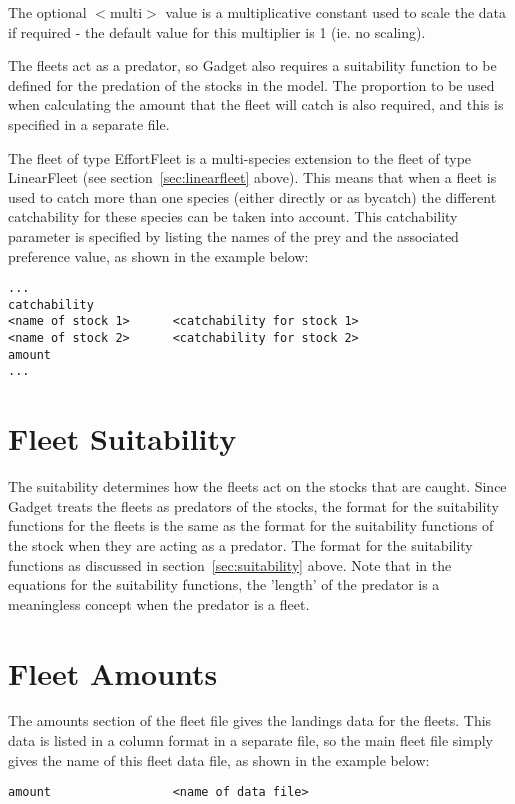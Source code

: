 \documentclass[10pt,twoside]{book}
\begin{document}
The optional $<$multi$>$ value is a multiplicative constant used to scale the data if required - the default value for this multiplier is 1 (ie. no scaling).

\bigskip
The fleets act as a predator, so Gadget also requires a suitability function to be defined for the predation of the stocks in the model.  The proportion to be used when calculating the amount that the fleet will catch is also required, and this is specified in a separate file.

\bigskip
The fleet of type EffortFleet is a multi-species extension to the fleet of type LinearFleet (see section~\ref{sec:linearfleet} above).  This means that when a fleet is used to catch more than one species (either directly or as bycatch) the different catchability for these species can be taken into account.  This catchability parameter is specified by listing the names of the prey and the associated preference value, as shown in the example below:

{\small\begin{verbatim}
...
catchability
<name of stock 1>      <catchability for stock 1>
<name of stock 2>      <catchability for stock 2>
amount
...
\end{verbatim}}

\section{Fleet Suitability}\label{sec:fleetsuit}
The suitability determines how the fleets act on the stocks that are caught.  Since Gadget treats the fleets as predators of the stocks, the format for the suitability functions for the fleets is the same as the format for the suitability functions of the stock when they are acting as a predator.  The format for the suitability functions as discussed in section~\ref{sec:suitability} above.  Note that in the equations for the suitability functions, the 'length' of the predator is a meaningless concept when the predator is a fleet.

\section{Fleet Amounts}\label{sec:fleetamount}
The amounts section of the fleet file gives the landings data for the fleets.  This data is listed in a column format in a separate file, so the main fleet file simply gives the name of this fleet data file, as shown in the example below:

{\small\begin{verbatim}
amount                 <name of data file>
\end{verbatim}}
\end{document}

